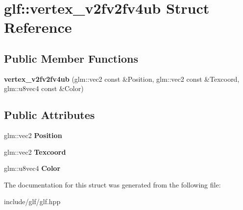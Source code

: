 \hypertarget{structglf_1_1vertex__v2fv2fv4ub}{\section{glf\-:\-:vertex\-\_\-v2fv2fv4ub Struct Reference}
\label{structglf_1_1vertex__v2fv2fv4ub}
}
\subsection*{Public Member Functions}
\begin{DoxyCompactItemize}
\item 
\hypertarget{structglf_1_1vertex__v2fv2fv4ub_a9b10ff9f075fe3581bb4d0328399c2e3}{{\bfseries vertex\-\_\-v2fv2fv4ub} (glm\-::vec2 const \&Position, glm\-::vec2 const \&Texcoord, glm\-::u8vec4 const \&Color)}\label{structglf_1_1vertex__v2fv2fv4ub_a9b10ff9f075fe3581bb4d0328399c2e3}

\end{DoxyCompactItemize}
\subsection*{Public Attributes}
\begin{DoxyCompactItemize}
\item 
\hypertarget{structglf_1_1vertex__v2fv2fv4ub_a759c12f1fd63b8be59605bc8716b68b5}{glm\-::vec2 {\bfseries Position}}\label{structglf_1_1vertex__v2fv2fv4ub_a759c12f1fd63b8be59605bc8716b68b5}

\item 
\hypertarget{structglf_1_1vertex__v2fv2fv4ub_a0cf853ea64e97c2e6d9307bba772a19a}{glm\-::vec2 {\bfseries Texcoord}}\label{structglf_1_1vertex__v2fv2fv4ub_a0cf853ea64e97c2e6d9307bba772a19a}

\item 
\hypertarget{structglf_1_1vertex__v2fv2fv4ub_a99e7356f4dad39c09ee3b3e4e95cdb32}{glm\-::u8vec4 {\bfseries Color}}\label{structglf_1_1vertex__v2fv2fv4ub_a99e7356f4dad39c09ee3b3e4e95cdb32}

\end{DoxyCompactItemize}


The documentation for this struct was generated from the following file\-:\begin{DoxyCompactItemize}
\item 
include/glf/glf.\-hpp\end{DoxyCompactItemize}
